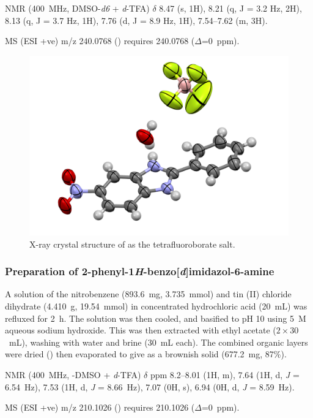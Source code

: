 \begin{refsection}
 NMR (400~MHz, DMSO-\emph{d6} + \textit{d}-TFA) $\delta$ 8.47 (s, 1H), 8.21 (q, J = 3.2 Hz, 2H), 8.13 (q, J = 3.7 Hz, 1H), 7.76 (d, J = 8.9 Hz, 1H), 7.54--7.62 (m, 3H).

MS (ESI +ve) m/z 240.0768 ()  requires 240.0768 ($\Delta$=0~ppm).

\begin{figure}[ht]
    \centering
    \includegraphics[width=0.8\linewidth]{Figures/rhs-nitro-xray.pdf}
    \caption{X-ray crystal structure of  as the tetrafluoroborate salt.}
    \label{fig:rhs-nitro-xray}
\end{figure}

\subsubsection[Preparation of \refcmpd{rhs-amine}]{Preparation of 2-phenyl-1\emph{H}-benzo[\emph{d}]imidazol-6-amine }
A solution of the nitrobenzene  (893.6~mg, 3.735~mmol) and tin (II) chloride dihydrate (4.410~g, 19.54~mmol) in concentrated hydrochloric acid (20~mL) was refluxed for 2~h.
The solution was then cooled, and basified to pH 10 using 5~M aqueous sodium hydroxide.
This was then extracted with ethyl acetate ($2\times30$~mL), washing with water and brine (30~mL each).
The combined organic layers were dried () then evaporated to give  as a brownish solid (677.2~mg, 87\%).

 NMR (400~MHz, -DMSO + \textit{d}-TFA) $\delta$ ppm 8.2--8.01 (1H, m), 7.64 (1H, d, \emph{J} = 6.54~Hz), 7.53 (1H, d, \emph{J} = 8.66~Hz), 7.07 (0H, s), 6.94 (0H, d, \emph{J} = 8.59~Hz).

MS (ESI +ve) m/z 210.1026 ()  requires 210.1026 ($\Delta$=0~ppm).


\end{refsection}
